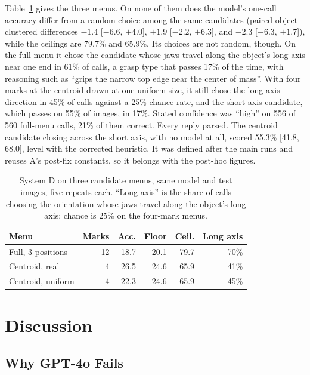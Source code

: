 \documentclass[10pt,conference,compsoc]{IEEEtran}
\begin{document}
Table~\ref{tab:menus} gives the three menus. On none of them does the
model's one-call accuracy differ from a random choice among the same
candidates (paired object-clustered differences $-1.4$ [$-6.6$, $+4.0$],
$+1.9$ [$-2.2$, $+6.3$], and $-2.3$ [$-6.3$, $+1.7$]), while the ceilings
are 79.7\% and 65.9\%. Its choices are not random, though. On the full
menu it chose the candidate whose jaws travel along the object's long axis
near one end in 61\% of calls, a grasp type that passes 17\% of the time,
with reasoning such as ``grips the narrow top edge near the center of
mass''. With four marks at the centroid drawn at one uniform size, it still
chose the long-axis direction in 45\% of calls against a 25\% chance rate,
and the short-axis candidate, which passes on 55\% of images, in 17\%.
Stated confidence was ``high'' on 556 of 560 full-menu calls, 21\% of them
correct. Every reply parsed. The centroid candidate closing across the short
axis, with no model at all, scored 55.3\% [41.8, 68.0], level with the
corrected heuristic. It was defined after the main runs and reuses A's
post-fix constants, so it belongs with the post-hoc figures.

\begin{table}[t]
\caption{System D on three candidate menus, same model and test images,
five repeats each. ``Long axis'' is the share of calls choosing the
orientation whose jaws travel along the object's long axis; chance is 25\%
on the four-mark menus.}
\label{tab:menus}
\centering
\footnotesize
\begin{tabular}{lrrrrr}
\toprule
Menu & Marks & Acc. & Floor & Ceil. & Long axis \\
\midrule
Full, 3 positions & 12 & 18.7 & 20.1 & 79.7 & 70\% \\
Centroid, real & 4 & 26.5 & 24.6 & 65.9 & 41\% \\
Centroid, uniform & 4 & 22.3 & 24.6 & 65.9 & 45\% \\
\bottomrule
\end{tabular}
\end{table}

\section{Discussion}

\subsection{Why GPT-4o Fails}
\end{document}
